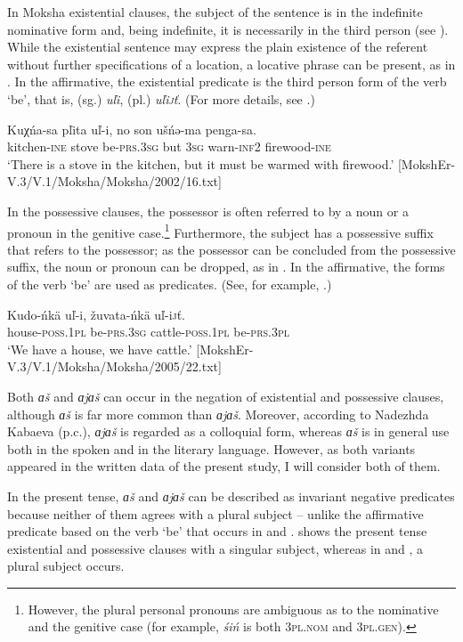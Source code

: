 \documentclass[output=paper]{langsci/langscibook}
\begin{document}
  In Moksha existential clauses, the subject of the sentence is in the indefinite nominative form and, being indefinite, it is necessarily in the third person (see ). While the existential sentence may express the plain existence of the referent without further specifications of a location, a locative phrase can be present, as in . In the affirmative, the existential predicate is the third person form of the verb `be', that is, (sg.) \textit{uľi}, (pl.) \textit{uľi\textsc{j}ť}. (For more details, see \citealt[47--52]{Hamari2007}.)

\ea\label{ex:moksha-stove}
\gll Kuχńa-sa pľita uľ-i, no son ušńə-ma penga-sa.\\
kitchen-\textsc{ine} stove be-\textsc{prs.3sg} but \textsc{3sg} warn-\textsc{inf2} firewood-\textsc{ine}\\
\glt `There is a stove in the kitchen, but it must be warmed with firewood.' [MokshEr-V.3/V.1/Moksha/Moksha/2002/16.txt]
\z

	In the possessive clauses, the possessor is often referred to by a noun or a pronoun in the genitive case.\footnote{However, the plural personal pronouns are ambiguous as to the nominative and the genitive case (for example, \textit{śiń} is both \textsc{3pl.nom} and 3\textsc{pl.gen}).} Furthermore, the subject has a possessive suffix that refers to the possessor; as the possessor can be concluded from the possessive suffix, the noun or pronoun can be dropped, as in . In the affirmative, the forms of the verb `be' are used as predicates. (See, for example, \citealt[52--57]{Hamari2007}.)

\ea\label{ex:moksha-cattle}
\gll Kudo-ńkä uľ-i, žuvata-ńkä uľ-i\textsc{j}ť.\\
house-\textsc{poss.1pl} be-\textsc{prs.3sg} cattle-\textsc{poss.1pl} be-\textsc{prs.3pl}\\
\glt `We have a house, we have cattle.' [MokshEr-V.3/V.1/Moksha/Moksha/2005/22.txt]
\z

  Both \textit{ɑš} and \textit{ɑjɑš} can occur in the negation of existential and possessive clauses, although \textit{ɑš} is far more common than \textit{ɑjɑš}. Moreover, according to Nadezhda Kabaeva (p.c.), \textit{ɑjɑš} is regarded as a colloquial form, whereas \textit{ɑš} is in general use both in the spoken and in the literary language. However, as both variants appeared in the written data of the present study, I will consider both of them.

  In the present tense, \textit{ɑš} and \textit{ɑjɑš} can be described as invariant negative predicates because neither of them agrees with a plural subject -- unlike the affirmative predicate based on the verb `be' that occurs in  and .  shows the present tense existential and possessive clauses with a singular subject, whereas in  and , a plural subject occurs.
\end{document}
